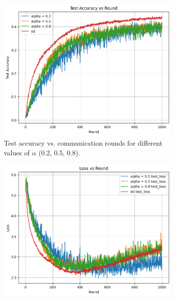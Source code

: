 \documentclass[10pt,twocolumn,letterpaper]{article}
\begin{document}
\begin{enumerate}
    \begin{figure}[H]
        \centering
        \begin{subfigure}{0.48\linewidth}
            \centering
            \includegraphics[width=\textwidth]{figs/diversity_test_acc_round_0.2_0.5_0.8.png}
            \caption{Test accuracy vs. communication rounds for different values of $\alpha$ (0.2, 0.5, 0.8).}
            \label{fig:testAcc}
        \end{subfigure}
        \hfill
        \begin{subfigure}{0.48\linewidth}
            \centering
            \includegraphics[width=\textwidth]{figs/diversity_test_loss_round_0.2_0.5_0.8.png}

\end{subfigure}
\end{figure}
\end{enumerate}
\end{document}
